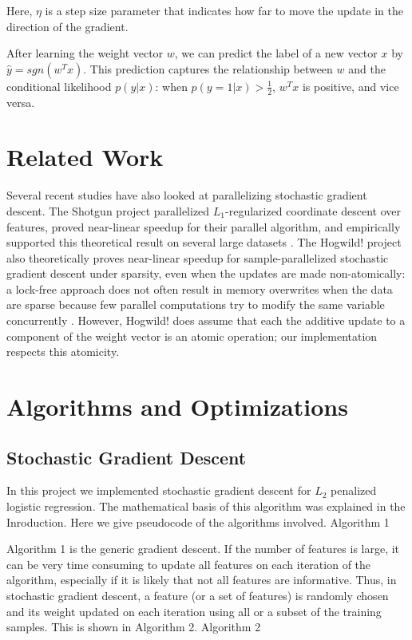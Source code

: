 \documentclass{article}
\begin{document}
Here, $\eta$ is a step size parameter that indicates how far to move the update in the direction of the gradient.

After learning the weight vector $w$, we can predict the label of a new vector $x$ by $\hat{y} = sgn(w^Tx)$. This prediction captures the relationship between $w$ and the conditional likelihood $p(y|x)$: when $p(y = 1|x) > \frac{1}{2}$, $w^Tx$ is positive, and vice versa.

\section{Related Work}
Several recent studies have also looked at parallelizing stochastic gradient descent. The Shotgun project parallelized $L_1$-regularized coordinate descent over features, proved near-linear speedup for their parallel algorithm, and empirically supported this theoretical result on several large datasets \cite{shotgun2011}. The Hogwild! project also theoretically proves near-linear speedup for sample-parallelized stochastic gradient descent under sparsity, even when the updates are made non-atomically: a lock-free approach does not often result in memory overwrites when the data are sparse because few parallel computations try to modify the same variable concurrently \cite{hogwild2011}. However, Hogwild! does assume that each the additive update to a component of the weight vector is an atomic operation; our implementation respects this atomicity. %

\section{Algorithms and Optimizations}
\subsection{Stochastic Gradient Descent}
In this project we implemented stochastic gradient descent for $L_2$ penalized logistic regression. The mathematical basis of this algorithm was explained in the Inroduction. Here we give pseudocode of the algorithms involved.
\hline
\hline
Algorithm 1
\hline
\begin{algorithmic}
\ENDFOR
{}
\ENDFOR
\ENDWHILE
\end{algorithmic}
\hline
Algorithm 1 is the generic gradient descent. If the number of features is large, it can be very time consuming to update all features on each iteration of the algorithm, especially if it is likely that not all features are informative.  Thus, in stochastic gradient descent, a feature (or a set of features) is randomly chosen and its weight updated on each iteration using all or a subset of the training samples. This is shown in Algorithm 2.
\hline
\hline
Algorithm 2
\hline
{}
\ENDFOR
{}
\ENDFOR
\ENDFOR
\hline
\end{document}
